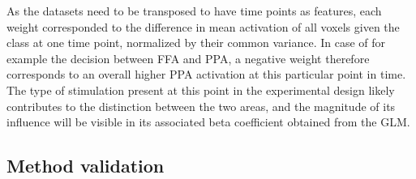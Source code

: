 \documentclass[a4paper, 12pt]{scrreprt}
\begin{document}
{As the datasets need to be transposed to have time points as features, each weight corresponded to the difference in mean activation of all voxels given the class at one time point, normalized by their common variance. In case of for example the decision between FFA and PPA, a negative weight therefore corresponds to an overall higher PPA activation at this particular point in time. The type of stimulation present at this point in the experimental design likely contributes to the distinction between the two areas, and the magnitude of its influence will be visible in its associated beta coefficient obtained from the GLM. \newline
 

\subsection{Method validation}\label{section:methodvalidation}

}
\end{document}
